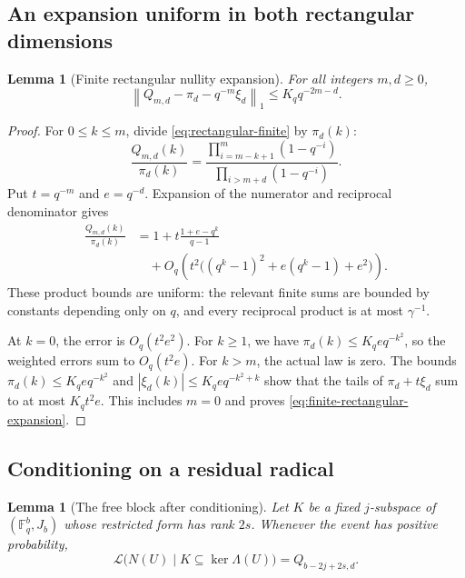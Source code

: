 \documentclass[11pt]{article}
\newtheorem{lemma}[theorem]{Lemma}
\theoremstyle{definition}
\theoremstyle{remark}
\newcommand{\F}{\mathbb F}
\newcommand{\Law}{\mathcal L}
\newcommand{\normone}[1]{\left\|#1\right\|_1}
\begin{document}
\subsection{An expansion uniform in both rectangular dimensions}

\begin{lemma}[Finite rectangular nullity expansion]\label{lem:finite-rectangular}
For all integers $m,d\ge0$,
\begin{equation}\label{eq:finite-rectangular-expansion}
 \normone{Q_{m,d}-\pi_d-q^{-m}\xi_d}
 \le K_q q^{-2m-d}.
\end{equation}
\end{lemma}

\begin{proof}
For $0\le k\le m$, divide \eqref{eq:rectangular-finite} by $\pi_d(k)$:
\[
 \frac{Q_{m,d}(k)}{\pi_d(k)}
 =\frac{\prod_{i=m-k+1}^{m}(1-q^{-i})}
        {\prod_{i>m+d}(1-q^{-i})}.
\]
Put $t=q^{-m}$ and $e=q^{-d}$. Expansion of the numerator and reciprocal denominator gives
\begin{align*}
 \frac{Q_{m,d}(k)}{\pi_d(k)}
 &=1+t\frac{1+e-q^k}{q-1}\\
 &\quad+O_q\left(t^2\bigl((q^k-1)^2+e(q^k-1)+e^2\bigr)\right).
\end{align*}
These product bounds are uniform: the relevant finite sums are bounded by constants depending only on $q$, and every reciprocal product is at most $\gamma^{-1}$.

At $k=0$, the error is $O_q(t^2e^2)$. For $k\ge1$, we have $\pi_d(k)\le K_qe q^{-k^2}$, so the weighted errors sum to $O_q(t^2e)$. For $k>m$, the actual law is zero. The bounds $\pi_d(k)\le K_qe q^{-k^2}$ and $|\xi_d(k)|\le K_qe q^{-k^2+k}$ show that the tails of $\pi_d+t\xi_d$ sum to at most $K_qt^2e$. This includes $m=0$ and proves \eqref{eq:finite-rectangular-expansion}.
\end{proof}

\subsection{Conditioning on a residual radical}

\begin{lemma}[The free block after conditioning]\label{lem:conditional}
Let $K$ be a fixed $j$-subspace of $(\F_q^b,J_b)$ whose restricted form has rank $2s$. Whenever the event has positive probability,
\begin{equation}\label{eq:conditional}
 \Law\bigl(N(U)\mid K\subseteq\ker\Lambda(U)\bigr)
 =Q_{b-2j+2s,d}.
\end{equation}
\end{lemma}
\end{document}
